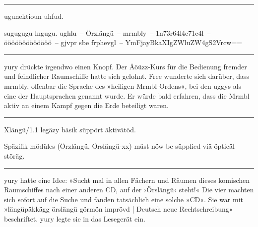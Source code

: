 \noindent \parbox{\textwidth}{ \vspace{3ex} \hrule \vspace{3ex}

    \begin{footnotesize}
    \begin{ttfamily}

\noindent ugunektioun uhfud.

\noindent sugugugu lngugu. ughlu~– Örzlängü~– mrmbly~– 1n73r64l4c71c4l~– ööööööööööööö~– gjvpr sbe frphevgl~– YmFjayBkaXIgZWluZW4gS2Vrcw==

    \end{ttfamily}
    \end{footnotesize}

\vspace{3ex} \hrule \vspace{3ex} }

yury drückte irgendwo einen Knopf. Der Äöüzz-Kurs für die Bedienung fremder und feindlicher Raumschiffe hatte sich gelohnt. Free wunderte sich darüber, dass mrmbly, offenbar die Sprache des »heiligen Mrmbl-Ordens«, bei den uggys als eine der Hauptsprachen genannt wurde. Er würde bald erfahren, dass die Mrmbl aktiv an einem Kampf gegen die Erde beteiligt waren.

\noindent \parbox{\textwidth}{ \vspace{3ex} \hrule \vspace{3ex}

    \begin{footnotesize}
    \begin{ttfamily}

\noindent Xlängü/1.1 legäzy bäsik süppört äktivätöd.

\noindent Späzifik mödüles (Örzlängü, Örslängü-xx) müst nöw be süpplied viä öpticäl störäg.

    \end{ttfamily}
    \end{footnotesize}

\vspace{3ex} \hrule \vspace{3ex} }

yury hatte eine Idee: »Sucht mal in allen Fächern und Räumen dieses komischen Raumschiffes nach einer anderen CD, auf der ›Örslängü‹ steht!« Die vier machten sich sofort auf die Suche und fanden tatsächlich eine solche »CD«. Sie war mit »längüpäkkägg örslängü görmön imprövd | Deutsch neue Rechtschreibung« beschriftet. yury legte sie in das Lesegerät ein.

